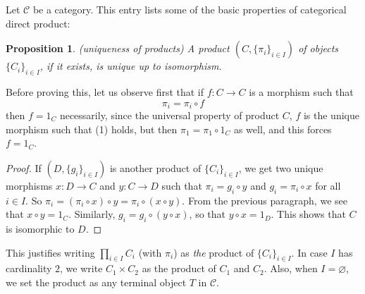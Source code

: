\documentclass[12pt]{article}
\newtheorem{prop}{Proposition}
\begin{document}
Let $\mathcal{C}$ be a category.  This entry lists some of the basic properties of categorical direct product:

\begin{prop} (uniqueness of products)  A product $(C,\lbrace \pi_i\rbrace_{i\in I})$ of objects $\lbrace C_i\rbrace_{i\in I}$, if it exists, is unique up to isomorphism. \end{prop}

Before proving this, let us observe first that if $f:C\to C$ is a morphism such that 
\begin{equation} \pi_i=\pi_i\circ f \end{equation}
then $f=1_C$ necessarily, since the universal property of product $C$, $f$ is the unique morphism such that (1) holds, but then $\pi_1=\pi_1\circ 1_C$ as well, and this forces $f=1_C$.

\begin{proof}  If $(D,\lbrace g_i\rbrace_{i\in I})$ is another product of $\lbrace C_i\rbrace_{i\in I}$, we get two unique morphisms $x:D\to C$ and $y:C\to D$ such that $\pi_i=g_i\circ y$ and $g_i=\pi_i\circ x$ for all $i\in I$.  So $\pi_i=(\pi_i\circ x)\circ y = \pi_i\circ (x\circ y)$.  From the previous paragraph, we see that $x\circ y=1_C$.  Similarly, $g_i=g_i\circ (y\circ x)$, so that $y\circ x=1_D$.  This shows that $C$ is isomorphic to $D$.
\end{proof}
This justifies writing $\prod_{i\in I} C_i$ (with $\pi_i$) as \emph{the} product of $\lbrace C_i\rbrace_{i\in I}$.  In case $I$ has cardinality $2$, we write $C_1\times C_2$ as the product of $C_1$ and $C_2$.  Also, when $I=\varnothing$, we set the product as any terminal object $T$ in $\mathcal{C}$.
\end{document}
